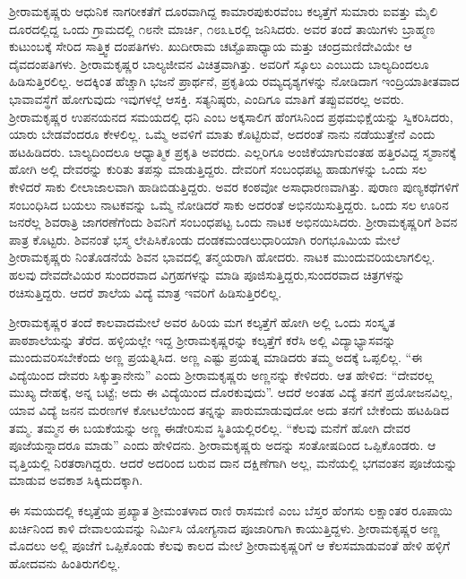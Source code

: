 \vskip 2pt

ಶ‍್ರೀರಾಮಕೃಷ್ಣರು ಆಧುನಿಕ ನಾಗರೀಕತೆಗೆ ದೂರವಾಗಿದ್ದ ಕಾಮಾರಪುಕುರವೆಂಬ ಕಲ್ಕತ್ತೆಗೆ ಸುಮಾರು ಐವತ್ತು ಮೈಲಿ ದೂರದಲ್ಲಿದ್ದ ಒಂದು ಗ್ರಾಮದಲ್ಲಿ ೧೮ನೇ ಮಾರ್ಚಿ, ೧೮೩೬ರಲ್ಲಿ ಜನಿಸಿದರು. ಅವರ ತಂದೆ ತಾಯಿಗಳು ಬ್ರಾಹ್ಮಣ ಕುಟುಂಬಕ್ಕೆ ಸೇರಿದ ಸಾತ್ತ್ವಿಕ ದಂಪತಿಗಳು. ಖುದೀರಾಮ ಚಟ್ಟೊಪಾಧ್ಯಾಯ ಮತ್ತು ಚಂದ್ರಮಣಿದೇವಿಯೇ ಆ ದೈವದಂಪತಿಗಳು. ಶ‍್ರೀರಾಮಕೃಷ್ಣರ ಬಾಲ್ಯಜೀವನ ವಿಚಿತ್ರವಾಗಿತ್ತು. ಅವರಿಗೆ ಸ್ಕೂಲು ಎಂಬುದು ಬಾಲ್ಯದಿಂದಲೂ ಹಿಡಿಸುತ್ತಿರಲಿಲ್ಲ. ಅದಕ್ಕಿಂತ ಹೆಚ್ಚಾಗಿ ಭಜನೆ ಪ್ರಾರ್ಥನೆ, ಪ್ರಕೃತಿಯ ರಮ್ಯದೃಶ್ಯಗಳನ್ನು ನೋಡಿದಾಗ ಇಂದ್ರಿಯಾತೀತವಾದ ಭಾವಾವಸ್ಥೆಗೆ ಹೋಗುವುದು ಇವುಗಳಲ್ಲೆ ಆಸಕ್ತಿ. ಸತ್ಯನಿಷ್ಠರು, ಎಂದಿಗೂ ಮಾತಿಗೆ ತಪ್ಪುವವರಲ್ಲ ಅವರು. ಶ‍್ರೀರಾಮಕೃಷ್ಣರ ಉಪನಯನದ ಸಮಯದಲ್ಲಿ ಧನಿ ಎಂಬ ಅಕ್ಕಸಾಲಿಗ ಹೆಂಗಸಿನಿಂದ ಪ್ರಥಮಭಿಕ್ಷೆಯನ್ನು ಸ್ವಿಕರಿಸಿದರು, ಯಾರು ಬೇಡವೆಂದರೂ ಕೇಳಲಿಲ್ಲ. ಒಮ್ಮೆ ಅವಳಿಗೆ ಮಾತು ಕೊಟ್ಟಿರುವೆ, ಅದರಂತೆ ನಾನು ನಡೆಯುತ್ತೇನೆ ಎಂದು ಹಟಹಿಡಿದರು. ಬಾಲ್ಯದಿಂದಲೂ ಆಧ್ಯಾತ್ಮಿಕ ಪ್ರಕೃತಿ ಅವರದು. ಎಲ್ಲರಿಗೂ ಅಂಜಿಕೆಯಾಗುವಂತಹ ಹತ್ತಿರವಿದ್ದ ಸ್ಮಶಾನಕ್ಕೆ ಹೋಗಿ ಅಲ್ಲಿ ದೇವರನ್ನು ಕುರಿತು ತಪಸ್ಸು ಮಾಡುತ್ತಿದ್ದರು. ದೇವರಿಗೆ ಸಂಬಂಧಪಟ್ಟ ಹಾಡುಗಳನ್ನು ಒಂದು ಸಲ ಕೇಳಿದರೆ ಸಾಕು ಲೀಲಾಜಾಲವಾಗಿ ಹಾಡಿಬಿಡುತ್ತಿದ್ದರು. ಅವರ ಕಂಠವೋ ಅಸಾಧಾರಣವಾಗಿತ್ತು. ಪುರಾಣ ಪುಣ್ಯಕಥೆಗಳಿಗೆ ಸಂಬಂಧಿಸಿದ ಬಯಲು ನಾಟಕವನ್ನು ಒಮ್ಮೆ ನೋಡಿದರೆ ಸಾಕು ಅದರಂತೆ ಅಭಿನಯಿಸುತ್ತಿದ್ದರು. ಒಂದು ಸಲ ಊರಿನ ಜನರೆಲ್ಲ ಶಿವರಾತ್ರಿ ಜಾಗರಣೆಗೆಂದು ಶಿವನಿಗೆ ಸಂಬಂಧಪಟ್ಟ ಒಂದು ನಾಟಕ ಅಭಿನಯಿಸಿದರು. ಶ‍್ರೀರಾಮಕೃಷ್ಣರಿಗೆ ಶಿವನ ಪಾತ್ರ ಕೊಟ್ಟರು. ಶಿವನಂತೆ ಭಸ್ಮ ಲೇಪಿಸಿಕೊಂಡು ದಂಡಕಮಂಡಲುಧಾರಿಯಾಗಿ ರಂಗಭೂಮಿಯ ಮೇಲೆ ಶ‍್ರೀರಾಮಕೃಷ್ಣರು ನಿಂತೊಡನೆಯೆ ಶಿವನ ಭಾವದಲ್ಲಿ ತನ್ಮಯರಾಗಿ ಹೋದರು. ನಾಟಕ ಮುಂದುವರಿಯಲಾಗಲಿಲ್ಲ. ಹಲವು ದೇವದೇವಿಯರ ಸುಂದರವಾದ ವಿಗ್ರಹಗಳನ್ನು ಮಾಡಿ ಪೂಜಿಸುತ್ತಿದ್ದರು,\break ಸುಂದರವಾದ ಚಿತ್ರಗಳನ್ನು ರಚಿಸುತ್ತಿದ್ದರು. ಆದರೆ ಶಾಲೆಯ ವಿದ್ಯೆ ಮಾತ್ರ ಇವರಿಗೆ ಹಿಡಿಸುತ್ತಿರಲಿಲ್ಲ.

ಶ‍್ರೀರಾಮಕೃಷ್ಣರ ತಂದೆ ಕಾಲವಾದಮೇಲೆ ಅವರ ಹಿರಿಯ ಮಗ ಕಲ್ಕತ್ತೆಗೆ ಹೋಗಿ ಅಲ್ಲಿ ಒಂದು ಸಂಸ್ಕೃತ ಪಾಠಶಾಲೆಯನ್ನು ತೆರೆದ. ಹಳ್ಳಿಯಲ್ಲೇ ಇದ್ದ ಶ‍್ರೀರಾಮಕೃಷ್ಣರನ್ನು ಕಲ್ಕತ್ತೆಗೆ ಕರೆಸಿ ಅಲ್ಲಿ ವಿದ್ಯಾಭ್ಯಾಸವನ್ನು ಮುಂದುವರಿಸಬೇಕೆಂದು ಅಣ್ಣ ಪ್ರಯತ್ನಿಸಿದ. ಅಣ್ಣ ಎಷ್ಟು ಪ್ರಯತ್ನ ಮಾಡಿದರು ತಮ್ಮ ಅದಕ್ಕೆ ಒಪ್ಪಲಿಲ್ಲ. “ಈ ವಿದ್ಯೆಯಿಂದ ದೇವರು ಸಿಕ್ಕುತ್ತಾನೇನು” ಎಂದು ಶ‍್ರೀರಾಮಕೃಷ್ಣರು ಅಣ್ಣನನ್ನು ಕೇಳಿದರು. ಆತ ಹೇಳಿದ: “ದೇವರಲ್ಲ ಮುಖ್ಯ ದೇಹಕ್ಕೆ, ಅನ್ನ ಬಟ್ಟೆ; ಅದು ಈ ವಿದ್ಯೆಯಿಂದ ದೊರಕುವುದು”. ಆದರೆ ಅಂತಹ ವಿದ್ಯೆ ತನಗೆ ಪ್ರಯೋಜನವಿಲ್ಲ, ಯಾವ ವಿದ್ಯೆ ಜನನ ಮರಣಗಳ ಕೋಟಲೆಯಿಂದ ತನ್ನನ್ನು ಪಾರುಮಾಡುವುದೋ ಅದು ತನಗೆ ಬೇಕೆಂದು ಹಟಹಿಡಿದ ತಮ್ಮ. ತಮ್ಮನ ಈ ಬಯಕೆಯನ್ನು ಅಣ್ಣ ಈಡೇರಿಸುವ ಸ್ಥಿತಿಯಲ್ಲಿರಲಿಲ್ಲ. “ಕೆಲವು ಮನೆಗೆ ಹೋಗಿ ದೇವರ ಪೂಜೆಯನ್ನಾದರೂ ಮಾಡು” ಎಂದು ಹೇಳಿದನು. ಶ‍್ರೀರಾಮಕೃಷ್ಣರು ಅದನ್ನು ಸಂತೋಷದಿಂದ ಒಪ್ಪಿಕೊಂಡರು. ಆ ವೃತ್ತಿಯಲ್ಲಿ ನಿರತರಾಗಿದ್ದರು. ಆದರೆ ಅದರಿಂದ ಬರುವ ದಾನ ದಕ್ಷಿಣೆಗಾಗಿ ಅಲ್ಲ, ಮನೆಯಲ್ಲಿ ಭಗವಂತನ ಪೂಜೆಯನ್ನು ಮಾಡುವ ಅವಕಾಶ ಸಿಕ್ಕಿದುದಕ್ಕಾಗಿ.

ಈ ಸಮಯದಲ್ಲಿ ಕಲ್ಕತ್ತೆಯ ಪ್ರಖ್ಯಾತ ಶ‍್ರೀಮಂತಳಾದ ರಾಣಿ ರಾಸಮಣಿ ಎಂಬ ಬೆಸ್ತರ ಹೆಂಗಸು ಲಕ್ಷಾಂತರ ರೂಪಾಯಿ ಖರ್ಚಿನಿಂದ ಕಾಳಿ ದೇವಾಲಯವನ್ನು ನಿರ್ಮಿಸಿ ಯೋಗ್ಯನಾದ ಪೂಜಾರಿಗಾಗಿ ಕಾಯುತ್ತಿದ್ದಳು. ಶ‍್ರೀರಾಮಕೃಷ್ಣರ ಅಣ್ಣ ಮೊದಲು ಅಲ್ಲಿ ಪೂಜೆಗೆ ಒಪ್ಪಿಕೊಂಡು ಕೆಲವು ಕಾಲದ ಮೇಲೆ ಶ‍್ರೀರಾಮಕೃಷ್ಣರಿಗೆ ಆ ಕೆಲಸಮಾಡುವಂತೆ ಹೇಳಿ ಹಳ್ಳಿಗೆ ಹೋದವನು ಹಿಂತಿರುಗಲಿಲ್ಲ.

